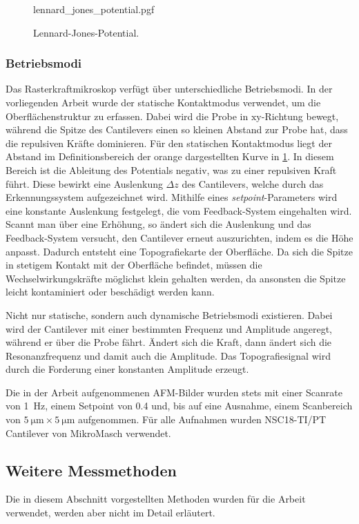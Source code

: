 \begin{figure}
    \centering
    {lennard_jones_potential.pgf}
    \caption{Lennard-Jones-Potential.}
    \label{fig:lennard_jones}
\end{figure}

\subsubsection{Betriebsmodi}
Das Rasterkraftmikroskop verfügt über unterschiedliche Betriebsmodi.
In der vorliegenden Arbeit wurde der statische Kontaktmodus verwendet, um die Oberflächenstruktur zu erfassen.
Dabei wird die Probe in $\mathrm{xy}$-Richtung bewegt, während die Spitze des Cantilevers einen so kleinen Abstand zur
Probe hat, dass die repulsiven Kräfte dominieren.
Für den statischen Kontaktmodus liegt der Abstand im Definitionsbereich der orange dargestellten Kurve in
\cref{fig:lennard_jones}.
In diesem Bereich ist die Ableitung des Potentials negativ, was zu einer repulsiven Kraft führt.
Diese bewirkt eine Auslenkung $\Delta z$ des Cantilevers, welche durch das Erkennungssystem aufgezeichnet wird.
Mithilfe eines \textit{setpoint}-Parameters wird eine konstante Auslenkung festgelegt, die vom Feedback-System
eingehalten wird.
Scannt man über eine Erhöhung, so ändert sich die Auslenkung und das Feedback-System versucht, den Cantilever erneut
auszurichten, indem es die Höhe anpasst.
Dadurch entsteht eine Topografiekarte der Oberfläche.
Da sich die Spitze in stetigem Kontakt mit der Oberfläche befindet, müssen die Wechselwirkungskräfte
möglichst klein gehalten werden, da ansonsten die Spitze leicht kontaminiert oder beschädigt werden kann.

Nicht nur statische, sondern auch dynamische Betriebsmodi existieren.
Dabei wird der Cantilever mit einer bestimmten Frequenz und Amplitude angeregt, während er über die Probe fährt.
Ändert sich die Kraft, dann ändert sich die Resonanzfrequenz und damit auch die Amplitude.
Das Topografiesignal wird durch die Forderung einer konstanten Amplitude erzeugt.

Die in der Arbeit aufgenommenen AFM-Bilder wurden stets mit einer Scanrate von \qty{1}{\hertz}, einem
Setpoint von \num{0.4} und, bis auf eine Ausnahme, einem Scanbereich von $\qty{5}{\micro\meter} \times
\qty{5}{\micro\meter}$ aufgenommen.
Für alle Aufnahmen wurden NSC18-TI/PT Cantilever von MikroMasch verwendet.

\subsection{Weitere Messmethoden}\label{subsec:weitere-messmethoden}
Die in diesem Abschnitt vorgestellten Methoden wurden für die Arbeit verwendet, werden aber
nicht im Detail erläutert.

